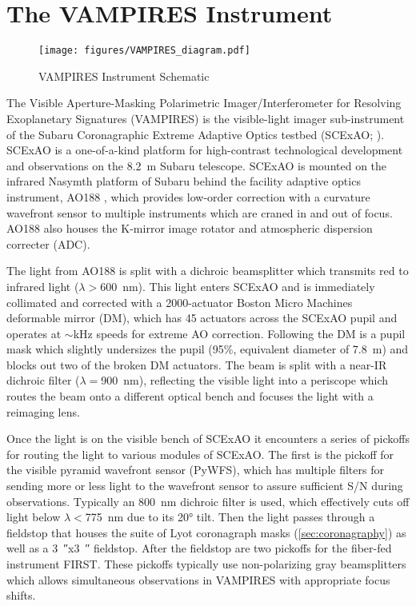 \section{The VAMPIRES Instrument}\label{sec:design}

\begin{figure*}[t]
    \centering
    \texttt{[image: figures/VAMPIRES\_diagram.pdf]}
    \caption{VAMPIRES Instrument Schematic}
    \label{fig:schematic}
\end{figure*}

The Visible Aperture-Masking Polarimetric Imager/Interferometer for Resolving Exoplanetary Signatures (VAMPIRES) is the visible-light imager sub-instrument of the Subaru Coronagraphic Extreme Adaptive Optics testbed (SCExAO; \citet{jovanovic_subaru_2015}). SCExAO is a one-of-a-kind platform for high-contrast technological development and observations on the \SI{8.2}{\meter} Subaru telescope. SCExAO is mounted on the infrared Nasymth platform of Subaru behind the facility adaptive optics instrument, AO188 \citep{minowa_performance_2010}, which provides low-order correction with a curvature wavefront sensor to multiple instruments which are craned in and out of focus. AO188 also houses the K-mirror image rotator and atmospheric dispersion correcter (ADC).

The light from AO188 is split with a dichroic beamsplitter which transmits red to infrared light ($\lambda >$\SI{600}{\nano\meter}). This light enters SCExAO and is immediately collimated and corrected with a 2000-actuator Boston Micro Machines deformable mirror (DM), which has 45 actuators across the SCExAO pupil and operates at $\sim$\si{\kilo\hertz} speeds for extreme AO correction. Following the DM is a pupil mask which slightly undersizes the pupil (95\%, equivalent diameter of \SI{7.8}{\meter}) and blocks out two of the broken DM actuators. The beam is split with a near-IR dichroic filter ($\lambda=$\SI{900}{\nano\meter}), reflecting the visible light into a periscope which routes the beam onto a different optical bench and focuses the light with a reimaging lens.

Once the light is on the visible bench of SCExAO it encounters a series of pickoffs for routing the light to various modules of SCExAO. The first is the pickoff for the visible pyramid wavefront sensor (PyWFS), which has multiple filters for sending more or less light to the wavefront sensor to assure sufficient S/N during observations. Typically an \SI{800}{\nano\meter} dichroic filter is used, which effectively cuts off light below $\lambda <$\SI{775}{\nano\meter} due to its \ang{20} tilt. Then the light passes through a fieldstop that houses the suite of Lyot coronagraph masks (\autoref{sec:coronagraphy}) as well as a \SI{3}{\arcsecond}x\SI{3}{\arcsecond} fieldstop. After the fieldstop are two pickoffs for the fiber-fed instrument FIRST. These pickoffs typically use non-polarizing gray beamsplitters which allows simultaneous observations in VAMPIRES with appropriate focus shifts.

